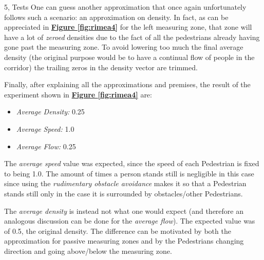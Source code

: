 \documentclass[10pt,a4paper]{article}
\begin{document}
\begin{task}{5, Tests}
One can guess another approximation that once again unfortunately follows such a scenario: an approximation on density. In fact, as can be appreciated in \textbf{\hyperref[fig:rimea4]{ Figure \ref{fig:rimea4}}} for the left measuring zone, that zone will have a lot of \textit{zeroed} densities due to the fact of all the pedestrians already having gone past the measuring zone. To avoid lowering too much the final average density (the original purpose would be to have a continual flow of people in the corridor) the trailing zeros in the density vector are trimmed.

Finally, after explaining all the approximations and premises, the result of the experiment shown in \textbf{\hyperref[fig:rimea4]{ Figure \ref{fig:rimea4}}} are:
\begin{itemize}
    \item \textit{Average Density:} 0.25
    \item \textit{Average Speed:} 1.0
    \item \textit{Average Flow:} 0.25
\end{itemize}
The \textit{average speed} value was expected, since the speed of each Pedestrian is fixed to being 1.0. The amount of times a person stands still is negligible in this case since using the \textit{rudimentary obstacle avoidance} makes it so that a Pedestrian stands still only in the case it is surrounded by obstacles/other Pedestrians.

The \textit{average density} is instead not what one would expect (and therefore an analogous discussion can be done for the \textit{average flow}). The expected value was of 0.5, the original density. The difference can be motivated by both the approximation for passive measuring zones and by the Pedestrians changing direction and going above/below the measuring zone.


\end{task}
\end{document}
